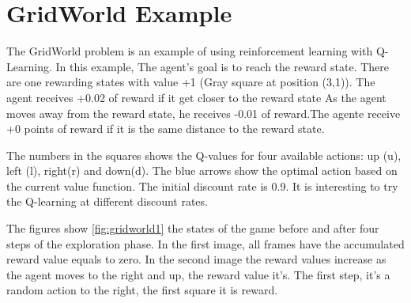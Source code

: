 \section{GridWorld Example}

The GridWorld problem is an example of using reinforcement learning with Q-Learning. In this example,  The agent's goal is to reach the reward state.  There are one rewarding states with value +1 (Gray square at position (3,1)). The agent receives +0.02 of reward if it get closer to the reward state  As the agent moves away from the reward state, he receives -0.01 of reward.The agente receive +0 points of reward if it is the same distance to the reward state.

The numbers in the squares shows the Q-values  for four available actions: up (u), left (l), right(r) and down(d). The blue arrows show the optimal action based on the current value function. The initial discount rate is 0.9. It is interesting to try the Q-learning at different discount rates.

The figures show  \ref{fig:gridworld1} the states of the game before and after  four steps of the exploration phase. In the first image, all frames have the accumulated reward value equals to zero. In the second image the reward values increase as the agent moves to the right and up, the reward value it's. The first step, it's a random action to the right, the first square it is reward.

